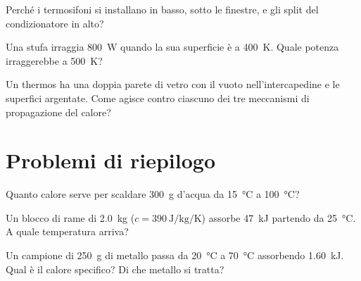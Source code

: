 \begin{esercizio}
Perché i termosifoni si installano in basso, sotto le finestre, e gli split del condizionatore in alto?\\
\end{esercizio}

\begin{esercizio}
Una stufa irraggia \SI{800}{\watt} quando la sua superficie è a \SI{400}{\kelvin}. Quale potenza irraggerebbe a \SI{500}{\kelvin}?\\
\end{esercizio}

\begin{esercizio}
Un thermos ha una doppia parete di vetro con il vuoto nell'intercapedine e le superfici argentate. Come agisce contro ciascuno dei tre meccanismi di propagazione del calore?\\
\end{esercizio}

\section{Problemi di riepilogo}

\begin{esercizio}
Quanto calore serve per scaldare \SI{300}{\gram} d'acqua da \SI{15}{\celsius} a \SI{100}{\celsius}?\\
\end{esercizio}

\begin{esercizio}
Un blocco di rame di \SI{2,0}{\kilogram} ($c = \SI{390}{\joule\per\kilogram\per\kelvin}$) assorbe \SI{47}{\kilo\joule} partendo da \SI{25}{\celsius}. A quale temperatura arriva?\\
\end{esercizio}

\begin{esercizio}
Un campione di \SI{250}{\gram} di metallo passa da \SI{20}{\celsius} a \SI{70}{\celsius} assorbendo \SI{1,60}{\kilo\joule}. Qual è il calore specifico? Di che metallo si tratta?\\
\end{esercizio}

